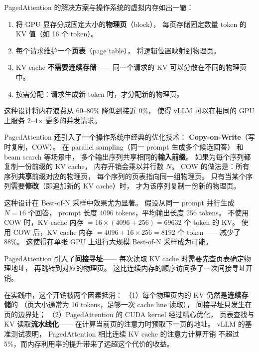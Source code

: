 PagedAttention 的解决方案与操作系统的虚拟内存如出一辙：
\begin{enumerate}[noitemsep]
  \item 将 GPU 显存分成固定大小的\textbf{物理页}（block），
        每页存储固定数量 token 的 KV 值（如 16 个 token）。
  \item 每个请求维护一个\textbf{页表}（page table），
        将逻辑位置映射到物理页。
  \item KV cache \textbf{不需要连续存储}——
        同一个请求的 KV 可以分散在不同的物理页中。
  \item 按需分配：请求生成新 token 时，才分配新的物理页。
\end{enumerate}

这种设计将内存浪费从 60--80\% 降低到接近 0\%，
使得 vLLM 可以在相同的 GPU 上服务 2--4$\times$ 更多的并发请求。

PagedAttention 还引入了一个操作系统中经典的优化技术：
\textbf{Copy-on-Write}（写时复制，COW）。
在 parallel sampling（同一 prompt 生成多个候选回答）
和 beam search 等场景中，
多个输出序列共享相同的\textbf{输入前缀}。
如果为每个序列都复制一份前缀的 KV cache，
内存开销会乘以并行数 $N$。
COW 的做法是：所有序列\textbf{共享}前缀对应的物理页，
每个序列的页表指向同一组物理页。
只有当某个序列需要\textbf{修改}（即追加新的 KV cache）时，
才为该序列复制一份新的物理页。

这种设计在 Best-of-N 采样中效果尤为显著。
假设从同一 prompt 并行生成 $N=16$ 个回答，
prompt 长度 4096 tokens，平均输出长度 256 tokens。
不使用 COW 时，KV cache 内存 $= 16 \times (4096 + 256) = 69632$ 个 token 的 KV。
使用 COW 后，KV cache 内存 $= 4096 + 16 \times 256 = 8192$ 个 token——
减少了 $88\%$。
这使得在单张 GPU 上进行大规模 Best-of-N 采样成为可能。

\begin{whybox}
PagedAttention 引入了\textbf{间接寻址}——
每次读取 KV cache 时需要先查页表确定物理地址，
再跳转到对应的物理页。
这比连续内存的顺序访问多了一次间接寻址开销。

在实践中，这个开销被两个因素抵消：
（1）每个物理页内的 KV 仍然是\textbf{连续存储}的
（页大小通常为 16 tokens，足够一次 cache line 读取），
间接寻址只发生在页的边界处；
（2）PagedAttention 的 CUDA kernel 经过精心优化，
页表查找与 KV 读取\textbf{流水线化}——
在计算当前页的注意力时预取下一页的地址。
vLLM 的基准测试表明，
PagedAttention 相比连续 KV cache 的注意力计算开销
不超过 5\%，而内存利用率的提升带来了远超这个代价的收益。
\end{whybox}

